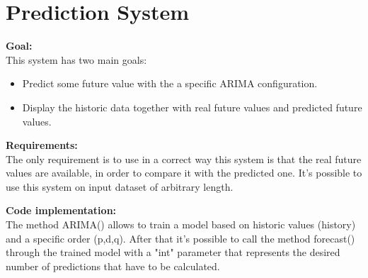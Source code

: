  \begin{table}[ht]
         \caption{MAPE Results for some particular dataset about the parameter "feedConsumption"}   
   \label{table: MAPE_Results_feedConsumption} 
\end{table}     


 
\newpage
\section{Prediction System}
\textbf{Goal:}\\ 
This system has two main goals:
\vspace{-5mm}
\begin{itemize}
 \setlength{\itemsep}{-5pt} 
\item Predict some future value with the a specific ARIMA configuration.
\item Display the historic data together with real future values and predicted future values.
\end{itemize}

\textbf{Requirements:}\\
The only requirement is to use in a correct way this system is that the real future values are available, in order to compare it with the predicted one. It's possible to use this system on input dataset of arbitrary length.


\textbf{Code implementation:}\\
The method ARIMA() allows to train a model based on historic values (history) and a specific order (p,d,q). After that it's possible to call the method forecast() through the trained model with a "int" parameter that represents the desired number of predictions that have to be calculated.

